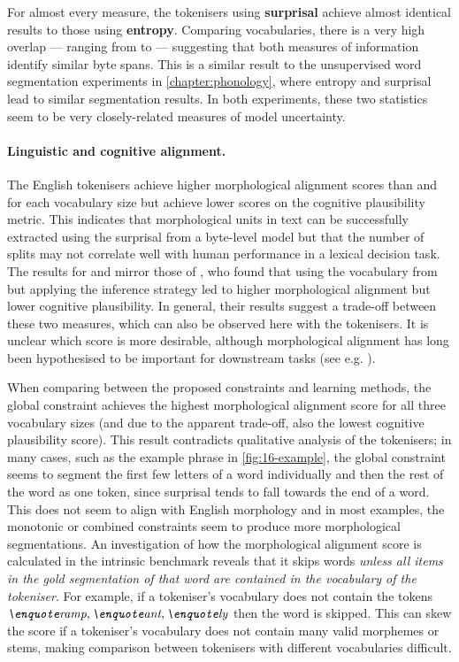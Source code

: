 For almost every measure, the tokenisers using \textbf{surprisal} achieve almost identical results to those using \textbf{entropy}. Comparing vocabularies, there is a very high overlap --- ranging from  to  --- suggesting that both measures of information identify similar byte spans. This is a similar result to the unsupervised word segmentation experiments in \cref{chapter:phonology}, where entropy and surprisal lead to similar segmentation results. In both experiments, these two statistics seem to be very closely-related measures of model uncertainty. %

\paragraph{Linguistic and cognitive alignment.}

The English \bytespan tokenisers achieve higher morphological alignment scores than \bpe and \bpewp for each vocabulary size but achieve lower scores on the cognitive plausibility metric. This indicates that morphological units in text can be successfully extracted using the surprisal from a byte-level model but that the number of splits may not correlate well with human performance in a lexical decision task. The results for \bpe and \bpewp mirror those of \citet{uzan-etal-2024-greed}, who found that using the vocabulary from \bpe but applying the \wordpiecefull inference strategy led to higher morphological alignment but lower cognitive plausibility. In general, their results suggest a trade-off between these two measures, which can also be observed here with the \bytespan tokenisers. It is unclear which score is more desirable, although morphological alignment has long been hypothesised to be important for downstream tasks (see e.g. \citet{gow-smith-etal-2022-improving}).

When comparing between the proposed constraints and learning methods, the global constraint achieves the highest morphological alignment score for all three vocabulary sizes (and due to the apparent trade-off, also the lowest cognitive plausibility score). This result contradicts qualitative analysis of the tokenisers; in many cases, such as the example phrase in \cref{fig:16-example}, the global constraint seems to segment the first few letters of a word individually and then the rest of the word as one token, since surprisal tends to fall towards the end of a word. This does not seem to align with English morphology and in most examples, the monotonic or combined constraints seem to produce more morphological segmentations. An investigation of how the morphological alignment score is calculated in the intrinsic benchmark reveals that it skips words \emph{unless all items in the gold segmentation of that word are contained in the vocabulary of the tokeniser}. For example, if a tokeniser's vocabulary does not contain the tokens \(\ex{ramp}, \ex{ant}, \ex{ly}\) then the word  is skipped. This can skew the score if a tokeniser's vocabulary does not contain many valid morphemes or stems, making comparison between tokenisers with different vocabularies difficult.

